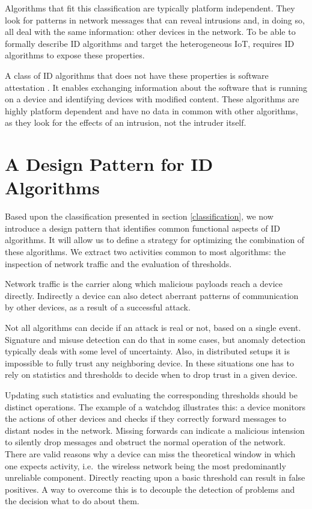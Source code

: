 \documentclass[conference]{IEEEtran}
\begin{document}
Algorithms that fit this classification are typically platform independent.
They look for patterns in network messages that can reveal intrusions and, in
doing so, all deal with the same information: other devices in the network. To
be able to formally describe ID algorithms and target the heterogeneous IoT,
\NAME requires ID algorithms to expose these properties.

A class of ID algorithms that does not have these properties is software
attestation \cite{seshadri2008sake}. It enables exchanging information about
the software that is running on a device and identifying devices with modified
content. These algorithms are highly platform dependent and have no data in
common with other algorithms, as they look for the effects of an intrusion, not
the intruder itself.

\section{A Design Pattern for ID Algorithms}
\label{pattern}

Based upon the classification presented in section \ref{classification}, we now
introduce a design pattern that identifies common functional aspects of ID
algorithms. It will allow us to define a strategy for optimizing the
combination of these algorithms. We extract two activities common to most
algorithms: the inspection of network traffic and the evaluation of thresholds.

Network traffic is the carrier along which malicious payloads reach a device
directly. Indirectly a device can also detect aberrant patterns of
communication by other devices, as a result of a successful attack.

Not all algorithms can decide if an attack is real or not, based on a single
event. Signature and misuse detection can do that in some cases, but anomaly
detection typically deals with some level of uncertainty. Also, in distributed
setups it is impossible to fully trust any neighboring device. In these
situations one has to rely on statistics and thresholds to decide when to drop
trust in a given device.

Updating such statistics and evaluating the corresponding thresholds should be
distinct operations. The example of a watchdog \cite{mishra2004intrusion}
illustrates this: a device monitors the actions of other devices and checks if
they correctly forward messages to distant nodes in the network. Missing
forwards can indicate a malicious intension to silently drop messages and
obstruct the normal operation of the network. There are valid reasons why a
device can miss the theoretical window in which one expects activity, i.e.\ the
wireless network being the most predominantly unreliable component. Directly
reacting upon a basic threshold can result in false positives. A way to
overcome this is to decouple the detection of problems and the decision what to
do about them.
\end{document}
